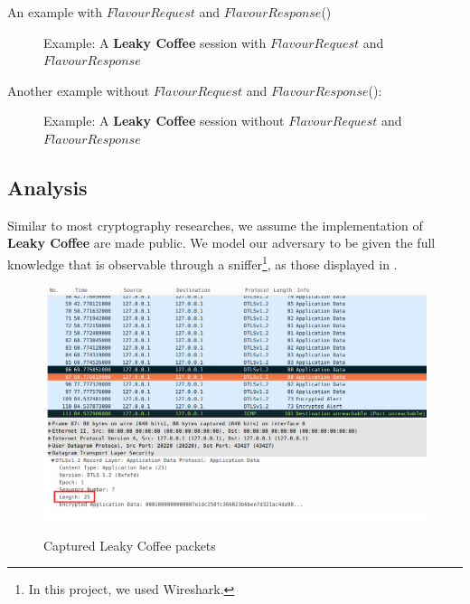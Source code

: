 \begin{example} \label{Ex: An example with $FlavourRequest$ and $FlavourResponse$}
{An example with $FlavourRequest$ and $FlavourResponse$()}

{
\begin{figure}[H]
\centering
\resizebox{7cm}{!}
{}
\caption{Example: A \textbf{Leaky Coffee} session with $FlavourRequest$ and $FlavourResponse$}
\label{Fig: Leaky-Coffee Example1}
\end{figure}
}
\end{example}

\begin{example} \label{Ex: A Leaky-Coffee session without $FlavourRequest$ and $FlavourResponse$}
{Another example without $FlavourRequest$ and $FlavourResponse$()}:

\begin{figure}[H]
\centering
\resizebox{6cm}{!}
{}
\caption{Example: A \textbf{Leaky Coffee} session without $FlavourRequest$ and $FlavourResponse$}
\label{Fig: Leaky-Coffee Example2}
\end{figure}
\end{example}

\subsection{Analysis}

Similar to most cryptography researches, we assume the implementation of \textbf{Leaky Coffee} are made public. We model our adversary to be given the full knowledge that is observable through a sniffer\footnote{In this project, we used Wireshark\cite{Wireshark}.}, as those displayed in .

\begin{figure}[H] 
\centering
\resizebox{14cm}{!}
{\includegraphics{./Pics/Wireshark01.png}}
\caption{Captured Leaky Coffee packets}
\label{Fig: Captured Leaky Coffee packets}
\end{figure}


